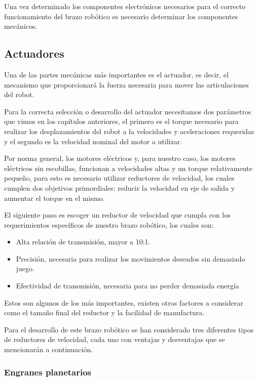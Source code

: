 
Una vez determinado los componentes electrónicos necesarios para el correcto funcionamiento del brazo robótico es necesario determinar los componentes mecánicos.

\subsection{Actuadores}

Una de las partes mecánicas más importantes es el actuador, es decir, el mecanismo que proporcionará la fuerza necesaria para mover las articulaciones del robot.

Para la correcta selección o desarrollo del actuador necesitamos dos parámetros que vimos en los capítulos anteriores, el primero es el torque necesario para realizar los desplazamientos del robot a la velocidades y aceleraciones requeridas y el segundo es la velocidad nominal del motor a utilizar.

Por norma general, los motores eléctricos y, para nuestro caso, los motores eléctricos sin escobillas, funcionan a velocidades altas y un torque relativamente pequeño, para esto es necesario utilizar reductores de velocidad, los cuales cumplen dos objetivos primordiales: reducir la velocidad en eje de salida y aumentar el torque en el mismo.

El siguiente paso es escoger un reductor de velocidad que cumpla con los requerimientos específicos de nuestro brazo robótico, los cuales son:

\begin{itemize}
\itemsep0em
\item Alta relación de transmisión, mayor a 10:1.
\item Precisión, necesaria para realizar los movimientos deseados sin demasiado juego. 
\item Efectividad de transmisión, necesaria para no perder demasiada energía
\end{itemize}

Estos son algunos de los más importantes, existen otros factores a considerar como el tamaño final del reductor y la facilidad de manufactura.

Para el desarrollo de este brazo robótico se han considerado tres diferentes tipos de reductores de velocidad, cada uno con ventajas y desventajas que se mencionarán a continuación.

\subsubsection{Engranes planetarios}

